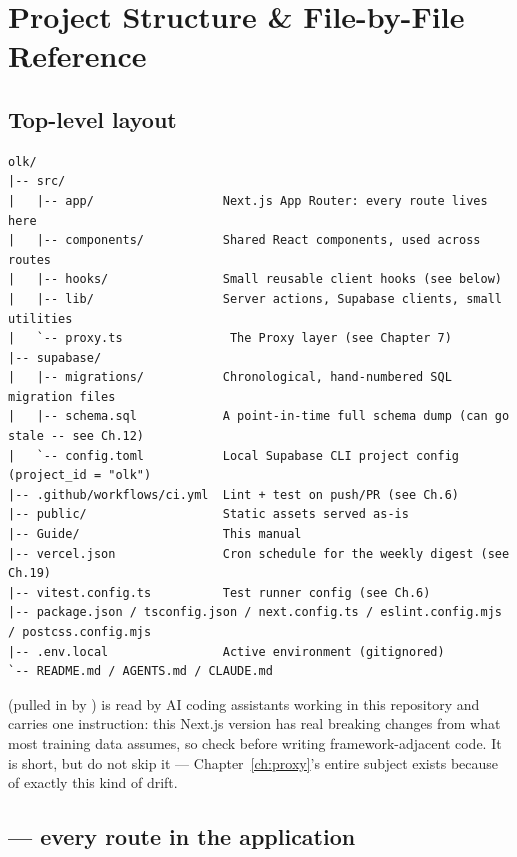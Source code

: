 \chapter{Project Structure \& File-by-File Reference}
\label{ch:project-structure}

\section{Top-level layout}

\begin{lstlisting}[style=olkcodetree, caption={Repository root (trimmed of build artefacts, node\_modules, and dotfiles)}]
olk/
|-- src/
|   |-- app/                  Next.js App Router: every route lives here
|   |-- components/           Shared React components, used across routes
|   |-- hooks/                Small reusable client hooks (see below)
|   |-- lib/                  Server actions, Supabase clients, small utilities
|   `-- proxy.ts               The Proxy layer (see Chapter 7)
|-- supabase/
|   |-- migrations/           Chronological, hand-numbered SQL migration files
|   |-- schema.sql            A point-in-time full schema dump (can go stale -- see Ch.12)
|   `-- config.toml           Local Supabase CLI project config (project_id = "olk")
|-- .github/workflows/ci.yml  Lint + test on push/PR (see Ch.6)
|-- public/                   Static assets served as-is
|-- Guide/                    This manual
|-- vercel.json               Cron schedule for the weekly digest (see Ch.19)
|-- vitest.config.ts          Test runner config (see Ch.6)
|-- package.json / tsconfig.json / next.config.ts / eslint.config.mjs / postcss.config.mjs
|-- .env.local                Active environment (gitignored)
`-- README.md / AGENTS.md / CLAUDE.md
\end{lstlisting}

\begin{olknote}
 (pulled in by ) is read by AI coding assistants working in this repository and carries one instruction: this Next.js version has real breaking changes from what most training data assumes, so check  before writing framework-adjacent code. It is short, but do not skip it — Chapter~\ref{ch:proxy}'s entire subject exists because of exactly this kind of drift.
\end{olknote}

\section{ — every route in the application}

